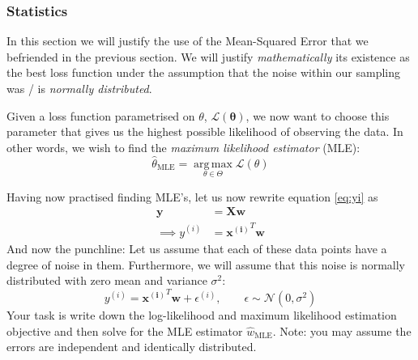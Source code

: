 \documentclass[12pt,dvipsnames,addpoints]{exam}
\renewcommand\vec{\mathbf}
\begin{document}
\subsubsection{Statistics}
In this section we will justify the use of the Mean-Squared Error that we befriended in the previous section. We will justify \emph{mathematically} its existence as the best loss function under the assumption that the noise within our sampling was / is \emph{normally distributed}.
\begin{questions}
    \setcounter{question}{17}
    \question Given a loss function parametrised on $\theta$, $\mathcal{L}(\vec{\theta})$, we now want to choose this parameter that gives us the highest possible likelihood of observing the data. In other words, we wish to find the \emph{maximum likelihood estimator} (MLE):\[\hat{\theta}_{\text{MLE}} = \operatorname*{arg\,max}_{\theta\in\Theta} \mathcal{L}(\theta)\]
    \question[5] Having now practised finding MLE's, let us now rewrite equation \ref{eq:yi} as 
    \begin{align*}
        \vec{y} &= \vec{X}\vec{w}\\
        \implies y^{(i)} &= \vec{x^{(i)}}^T\vec{w}
    \end{align*}
    And now the punchline: Let us assume that each of these data points have a degree of noise in them. Furthermore, we will assume that this noise is normally distributed with zero mean and variance $\sigma^2$:
    \[y^{(i)} = \vec{x^{(i)}}^T\vec{w} + \epsilon^{(i)},\qquad \epsilon\sim \mathcal{N}(0, \sigma^2)\]
    Your task is write down the log-likelihood and maximum likelihood estimation objective and then solve for the MLE estimator $\hat{w}_{\text{MLE}}$.
    Note: you may assume the errors are independent and identically distributed.
\end{questions}
\end{document}
